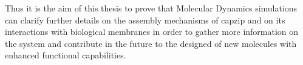 Thus it is the aim of this thesis to prove that Molecular Dynamics simulations can clarify further details on the assembly mechanisms of capzip and on its interactions with biological membranes in order to gather more information on the system and contribute in the future to the designed of new molecules with enhanced functional capabilities.





%


